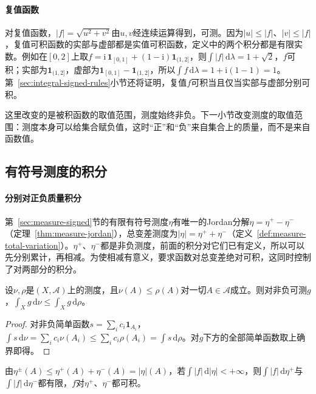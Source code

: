\paragraph{复值函数}
对复值函数，$|f|=\sqrt{u^2+v^2}$由$u,v$经连续运算得到，可测。因为$|u|\le|f|$、$|v|\le|f|$，复值可积函数的实部与虚部都是实值可积函数，定义中的两个积分都是有限实数。例如在$[0,2]$上取$f=\mathrm i\,\mathbf 1_{[0,1]}+(1-\mathrm i)\mathbf 1_{(1,2]}$，则$\int|f|\,\mathrm d\lambda=1+\sqrt2$，$f$可积；实部为$\mathbf 1_{(1,2]}$，虚部为$\mathbf 1_{[0,1]}-\mathbf 1_{(1,2]}$，所以$\int f\,\mathrm d\lambda=1+\mathrm i(1-1)=1$。第~\ref{sec:integral-signed-rules}小节还将证明，复值$f$可积当且仅当实部与虚部分别可积。

这里改变的是被积函数的取值范围，测度始终非负。下一小节改变测度的取值范围：测度本身可以给集合赋负值，这时“正”和“负”来自集合上的质量，而不是来自函数值。

\subsection{有符号测度的积分}
\label{sec:integral-signed-measure}

\paragraph{分别对正负质量积分}
第~\ref{sec:measure-signed}节的有限有符号测度$\eta$有唯一的Jordan分解$\eta=\eta^+-\eta^-$（定理~\ref{thm:measure-jordan}），总变差测度为$|\eta|=\eta^++\eta^-$（定义~\ref{def:measure-total-variation}）。$\eta^+$、$\eta^-$都是非负测度，前面的积分对它们已有定义，所以可以先分别累计，再相减。为使相减有意义，要求函数对总变差绝对可积，这同时控制了对两部分的积分。

\begin{lemma}[非负积分对测度的单调性]
\label{lem:integral-measure-monotone}
设$\nu,\rho$是$(X,\mathcal A)$上的测度，且$\nu(A)\le\rho(A)$对一切$A\in\mathcal A$成立。则对非负可测$g$，$\int_Xg\,\mathrm d\nu\le\int_Xg\,\mathrm d\rho$。
\end{lemma}

\begin{proof}
对非负简单函数$s=\sum_ic_i\mathbf 1_{A_i}$，$\int s\,\mathrm d\nu=\sum_ic_i\nu(A_i)\le\sum_ic_i\rho(A_i)=\int s\,\mathrm d\rho$。对$g$下方的全部简单函数取上确界即得。
\end{proof}

由$\eta^\pm(A)\le\eta^+(A)+\eta^-(A)=|\eta|(A)$，若$\int|f|\,\mathrm d|\eta|<+\infty$，则$\int|f|\,\mathrm d\eta^+$与$\int|f|\,\mathrm d\eta^-$都有限，$f$对$\eta^+$、$\eta^-$都可积。


